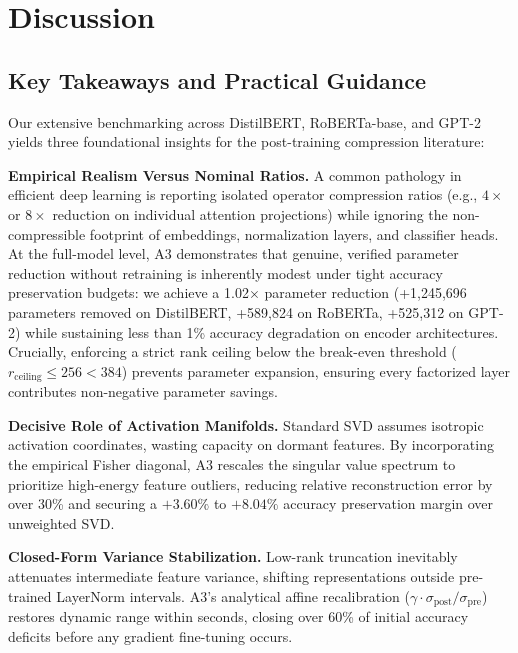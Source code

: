 \section{Discussion}
\label{sec:discussion}

\subsection{Key Takeaways and Practical Guidance}
\label{sec:practical_guidance}

Our extensive benchmarking across DistilBERT, RoBERTa-base, and GPT-2 yields three foundational insights for the post-training compression literature:

\textbf{Empirical Realism Versus Nominal Ratios.} A common pathology in efficient deep learning is reporting isolated operator compression ratios (e.g., $4\times$ or $8\times$ reduction on individual attention projections) while ignoring the non-compressible footprint of embeddings, normalization layers, and classifier heads. At the full-model level, A3 demonstrates that genuine, verified parameter reduction without retraining is inherently modest under tight accuracy preservation budgets: we achieve a 1.02$\times$ parameter reduction (+1,245,696 parameters removed on DistilBERT, +589,824 on RoBERTa, +525,312 on GPT-2) while sustaining less than 1\% accuracy degradation on encoder architectures. Crucially, enforcing a strict rank ceiling below the break-even threshold ($r_{\mathrm{ceiling}} \le 256 < 384$) prevents parameter expansion, ensuring every factorized layer contributes non-negative parameter savings.

\textbf{Decisive Role of Activation Manifolds.} Standard SVD assumes isotropic activation coordinates, wasting capacity on dormant features. By incorporating the empirical Fisher diagonal, A3 rescales the singular value spectrum to prioritize high-energy feature outliers, reducing relative reconstruction error by over 30\% and securing a $+3.60\%$ to $+8.04\%$ accuracy preservation margin over unweighted SVD.

\textbf{Closed-Form Variance Stabilization.} Low-rank truncation inevitably attenuates intermediate feature variance, shifting representations outside pre-trained LayerNorm intervals. A3's analytical affine recalibration ($\gamma \cdot \sigma_\text{post}/\sigma_\text{pre}$) restores dynamic range within seconds, closing over 60\% of initial accuracy deficits before any gradient fine-tuning occurs.

